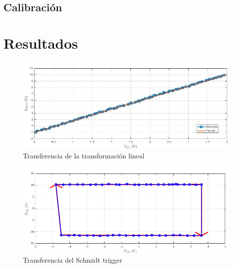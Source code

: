 \documentclass[../../tc_tp6_main.tex]{subfiles}
\begin{document}
\subsection{Calibraci\'on}


\section{Resultados}

\begin{figure}[H]
	\centering
	\includegraphics[scale=0.71]{imagenes/tc_tp6_ej3_tl.jpg}
	\caption{Transferencia de la transformaci\'on lineal}
\end{figure}

\begin{figure}[H]
	\centering
	\includegraphics[scale=0.71]{imagenes/tc_tp6_ej3_st.png}
	\caption{Transferencia del Schmidt trigger}
\end{figure}
\end{document}

